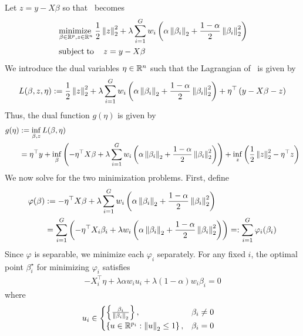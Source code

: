 Let $z = y - X\beta$ so that~ becomes
\begin{align}
    &\operatorname*{minimize\;}\limits_{\beta \in \mathbb{R}^p, z \in \mathbb{R}^n}
    \frac{1}{2} \left\|z\right\|_2^2
    +
    \lambda \sum\limits_{i=1}^G w_i \left(\alpha \left\|\beta_i\right\|_2 + \frac{1-\alpha}{2} \left\|\beta_i\right\|_2^2\right)
    \\
    &\operatorname{subject\;to} \quad z = y - X\beta
    \label{eq:appendix:edpp:objective-transformed}
\end{align}
We introduce the dual variables $\eta \in \mathbb{R}^n$ such that 
the Lagrangian of~
is given by
\begin{align*}
    L(\beta, z, \eta)
    :=
    \frac{1}{2} \left\|z\right\|_2^2 
    +
    \lambda \sum\limits_{i=1}^G w_i \left(\alpha \left\|\beta_i\right\|_2 + \frac{1-\alpha}{2} \left\|\beta_i\right\|_2^2\right)
    + \eta^\top \left(y - X\beta - z\right)
\end{align*}
Thus, the dual function $g(\eta)$ is given by
\begin{align*}
    g(\eta)
    &:=
    \inf\limits_{\beta, z} L(\beta, \eta)
    \\&=
    \eta^\top y + 
    \inf\limits_{\beta} 
    \left(-\eta^\top X \beta + \lambda \sum\limits_{i=1}^G w_i \left(\alpha \left\|\beta_i\right\|_2 + \frac{1-\alpha}{2} \left\|\beta_i\right\|_2^2\right)\right)
    +
    \inf\limits_{z}
    \left(
        \frac{1}{2} \left\|z\right\|_2^2 - \eta^\top z
    \right)
\end{align*}
We now solve for the two minimization problems.
First, define
\begin{align*}
    \varphi(\beta)
    &:=
    -\eta^\top X \beta + \lambda \sum\limits_{i=1}^G w_i \left(\alpha \left\|\beta_i\right\|_2 + \frac{1-\alpha}{2} \left\|\beta_i\right\|_2^2\right)
    \\&=
    \sum\limits_{i=1}^G
    \left(
        -\eta^\top X_i \beta_i + \lambda w_i \left(\alpha \left\|\beta_i\right\|_2 + \frac{1-\alpha}{2} \left\|\beta_i\right\|_2^2\right)
    \right)
    =:
    \sum\limits_{i=1}^G \varphi_i(\beta_i)
\end{align*}
Since $\varphi$ is separable, we minimize each $\varphi_i$ separately.
For any fixed $i$, the optimal point $\beta_i^\star$ for minimizing $\varphi_i$ satisfies
\begin{align}
    -X_i^\top \eta + \lambda \alpha w_i u_i + \lambda (1-\alpha) w_i \beta_i = 0
    \label{eq:appendix:edpp:subg1}
\end{align}
where 
\begin{align*}
    u_i
    &\in
    \begin{cases}
        \left\{\frac{\beta_i}{\left\|\beta_i\right\|_2}\right\} ,& \beta_i \neq 0 \\
        \left\{u \in \mathbb{R}^{p_i} : \left\|u\right\|_2 \leq 1\right\} ,& \beta_i = 0
    \end{cases}
\end{align*}
